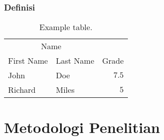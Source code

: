 \documentclass[11pt]{simart} %
\begin{document}
\lipsum[4-5]


\subsubsection{Definisi}

\lipsum[6-7]
\begin{table}[h] %
	\caption{Example table.}
	\centering
	\begin{tabular}{l l r}
		\toprule
		\multicolumn{2}{c}{Name} \\
		\cmidrule(r){1-2}
		First Name & Last Name & Grade \\
		\midrule
		John & Doe & $7.5$ \\
		Richard & Miles & $5$ \\
		\bottomrule
	\end{tabular}
\end{table}





\section{Metodologi Penelitian}

\lipsum[15-19]

%





\end{document}
